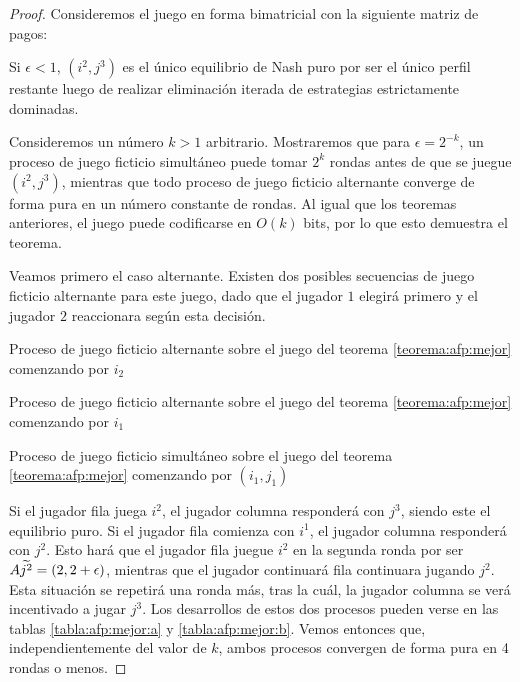 \begin{proof}
    Consideremos el juego en forma bimatricial con la siguiente matriz de pagos:

    

    Si $\epsilon < 1$, $(i^2, j^3)$ es el único equilibrio de Nash puro por ser el único perfil restante luego de realizar eliminación iterada de estrategias estrictamente dominadas.

    Consideremos un número $k > 1$ arbitrario. Mostraremos que para $\epsilon = 2^{-k}$, un proceso de juego ficticio simultáneo puede tomar $2^k$ rondas antes de que se juegue $(i^2, j^3)$, mientras que todo proceso de juego ficticio alternante converge de forma pura en un número constante de rondas. Al igual que los teoremas anteriores, el juego puede codificarse en $O(k)$ bits, por lo que esto demuestra el teorema.

    Veamos primero el caso alternante. Existen dos posibles secuencias de juego ficticio alternante para este juego, dado que el jugador $1$ elegirá primero y el jugador $2$ reaccionara según esta decisión.

    \begin{table}
        \centering
        
        \caption{Proceso de juego ficticio alternante sobre el juego del teorema \ref{teorema:afp:mejor} comenzando por $i_2$}
        \label{tabla:afp:mejor:b}
        \centering
        
        \caption{Proceso de juego ficticio alternante sobre el juego del teorema \ref{teorema:afp:mejor} comenzando por $i_1$}
        \label{tabla:afp:mejor:a}
        \centering
        
        \caption{Proceso de juego ficticio simultáneo sobre el juego del teorema \ref{teorema:afp:mejor} comenzando por $(i_1, j_1)$}
        \label{tabla:afp:mejor:c}
    \end{table}

    Si el jugador fila juega $i^2$, el jugador columna responderá con $j^3$, siendo este el equilibrio puro. Si el jugador fila comienza con $i^1$, el jugador columna responderá con $j^2$. Esto hará que el jugador fila juegue $i^2$ en la segunda ronda por ser $A\widetilde{j^2} = (2, 2 + \epsilon)$, mientras que el jugador continuará fila continuara jugando $j^2$. Esta situación se repetirá una ronda más, tras la cuál, la jugador columna se verá incentivado a jugar $j^3$. Los desarrollos de estos dos procesos pueden verse en las tablas \ref{tabla:afp:mejor:a} y \ref{tabla:afp:mejor:b}. Vemos entonces que, independientemente del valor de $k$, ambos procesos convergen de forma pura en 4 rondas o menos.


\end{proof}
